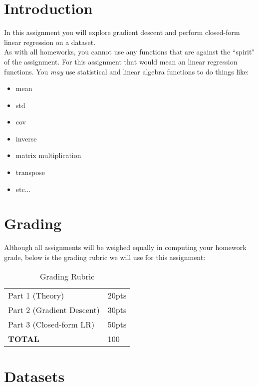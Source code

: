 \documentclass[12pt]{article}
\begin{document}
\maketitle


\section*{Introduction}
In this assignment you will explore gradient descent and perform closed-form linear regression on a dataset.\\

\noindent
As with all homeworks, you cannot use any functions that are against the ``spirit" of the assignment.  For this assignment that would mean an linear regression functions.   You \emph{may} use statistical and linear algebra functions to do things like:
\begin{itemize}
\item mean
\item std
\item cov
\item inverse
\item matrix multiplication
\item transpose
\item etc...
\end{itemize}


\section*{Grading}
Although all assignments will be weighed equally in computing your homework grade, below is the grading rubric we will use for this assignment:

\begin{table}[h]
\begin{center}
\begin{tabular}{|l|l|}
\hline
Part 1 (Theory) & 20pts\\
Part 2 (Gradient Descent) & 30pts\\
Part 3 (Closed-form LR) & 50pts\\
\hline
\textbf{TOTAL} & 100 \\
\hline
\end{tabular}
\caption{Grading Rubric}
\end{center}
\end{table}

\newpage
\section*{Datasets}
\end{document}
